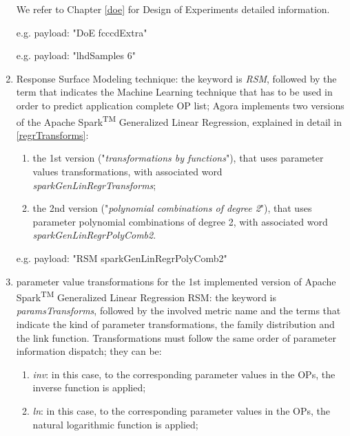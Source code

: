 \begin{enumerate}
    We refer to Chapter \ref{doe} for Design of Experiments detailed information.
    
    e.g. payload: "DoE fcccdExtra"
    
    e.g. payload: "lhdSamples 6"
    
    \item Response Surface Modeling technique: the keyword is \textit{RSM}, followed by the term that indicates the Machine Learning technique that has to be used in order to predict application complete OP list; Agora implements two versions of the Apache Spark\textsuperscript{TM} Generalized Linear Regression, explained in detail in \ref{regrTransforms}:
    
    \begin{enumerate}
    
        \item the 1st version ("\textit{transformations by functions}"), that uses parameter values transformations, with associated word \textit{sparkGenLinRegrTransforms};
        
        \item the 2nd version ("\textit{polynomial combinations of degree 2}"), that uses parameter polynomial combinations of degree 2, with associated word \textit{sparkGenLinRegrPolyComb2}.
    
    \end{enumerate}
    
    e.g. payload: "RSM sparkGenLinRegrPolyComb2"
    
    \item parameter value transformations for the 1st implemented version of Apache Spark\textsuperscript{TM} Generalized Linear Regression RSM: the keyword is \textit{paramsTransforms}, followed by the involved metric name and the terms that indicate the kind of parameter transformations, the family distribution and the link function. Transformations must follow the same order of parameter information dispatch; they can be:
    
    \begin{enumerate}
    
        \item \textit{inv}: in this case, to the corresponding parameter values in the OPs, the inverse function is applied;
        
        \item \textit{ln}: in this case, to the corresponding parameter values in the OPs, the natural logarithmic function is applied;
        

\end{enumerate}
\end{enumerate}
